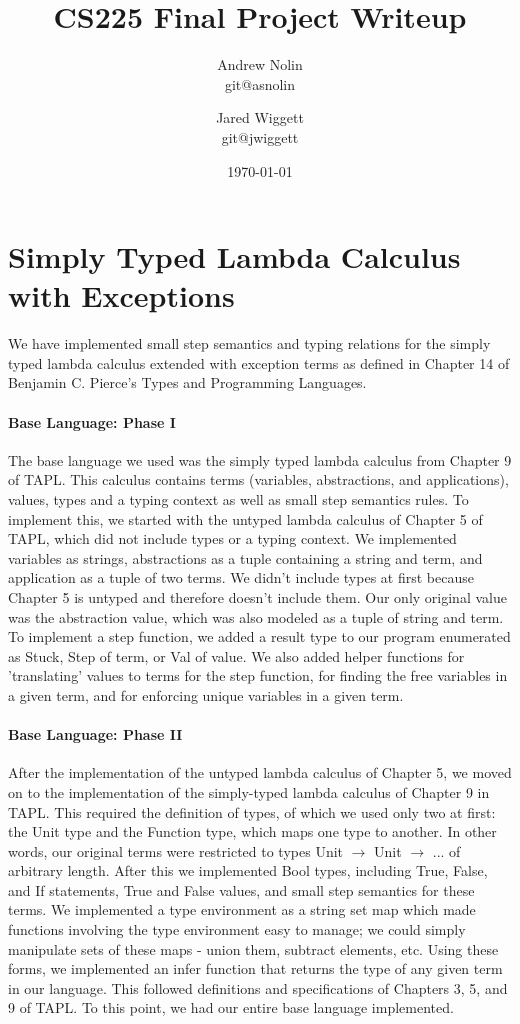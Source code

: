 \documentclass{article}
\title{CS225 Final Project Writeup}
\author{Andrew Nolin \\ git@asnolin \and Jared Wiggett \\ git@jwiggett}
\date{\today}
\begin{document}
\maketitle
\section*{Simply Typed Lambda Calculus with Exceptions}
We have implemented small step semantics and typing relations for the simply typed lambda calculus extended with exception terms as defined in Chapter 14 of Benjamin C. Pierce's Types and Programming Languages.

\paragraph{Base Language: Phase I}
The base language we used was the simply typed lambda calculus from Chapter 9 of TAPL. This calculus contains terms (variables, abstractions, and applications), values, types and a typing context as well as small step semantics rules. To implement this, we started with the untyped lambda calculus of Chapter 5 of TAPL, which did not include types or a typing context. We implemented variables as strings, abstractions as a tuple containing a string and term, and application as a tuple of two terms. We didn't include types at first because Chapter 5 is untyped and therefore doesn't include them. Our only original value was the abstraction value, which was also modeled as a tuple of string and term. To implement a step function, we added a result type to our program enumerated as Stuck, Step of term, or Val of value. We also added helper functions for 'translating' values to terms for the step function, for finding the free variables in a given term, and for enforcing unique variables in a given term.
\paragraph{Base Language: Phase II}
After the implementation of the untyped lambda calculus of Chapter 5, we moved on to the implementation of the simply-typed lambda calculus of Chapter 9 in TAPL. This required the definition of types, of which we used only two at first: the Unit type and the Function type, which maps one type to another. In other words, our original terms were restricted to types Unit \(\rightarrow\) Unit \(\rightarrow\) ... of arbitrary length. After this we implemented Bool types, including True, False, and If statements, True and False values, and small step semantics for these terms. We implemented a type environment as a string set map which made functions involving the type environment easy to manage; we could simply manipulate sets of these maps - union them, subtract elements, etc. Using these forms, we implemented an infer function that returns the type of any given term in our language. This followed definitions and specifications of Chapters 3, 5, and 9 of TAPL. To this point, we had our entire base language implemented.
\end{document}

